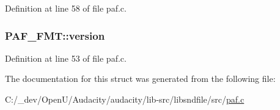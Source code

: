 Definition at line 58 of file paf.\+c.

\subsubsection[{\texorpdfstring{version}{version}}]{ P\+A\+F\+\_\+\+F\+M\+T\+::version}\hypertarget{struct_p_a_f___f_m_t_ab7e777e63b547008e49564b40da2fc45}{}\label{struct_p_a_f___f_m_t_ab7e777e63b547008e49564b40da2fc45}


Definition at line 53 of file paf.\+c.



The documentation for this struct was generated from the following file\+:\begin{DoxyCompactItemize}
\item 
C\+:/\+\_\+dev/\+Open\+U/\+Audacity/audacity/lib-\/src/libsndfile/src/\hyperlink{paf_8c}{paf.\+c}\end{DoxyCompactItemize}
